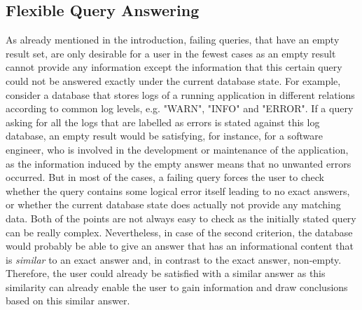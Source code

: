 

\subsection{Flexible Query Answering}
\label{sec:meth_fqa}

As already mentioned in the introduction, failing queries, that have an empty result set, are only desirable for a user in the fewest cases as an empty
result cannot provide any information except the information that this certain query could not be answered exactly under the current database state. For
example, consider a database that stores logs of a running application in different relations according to common log levels, e.g. "WARN", "INFO" and
"ERROR". If a query asking for all the logs that are labelled as errors is stated against this log database, an empty result would be satisfying, for 
instance, for a software engineer, who is involved in the development or maintenance of the application, as the information induced by the empty answer 
means that no unwanted errors occurred. But in most of the cases, a failing query forces the user to check whether the query contains some logical error
itself leading to no exact answers, or whether the current database state does actually not provide any matching data. Both of the points are not always
easy to check as the initially stated query can be really complex. Nevertheless, in case of the second criterion, the database would probably be able to
give an answer that has an informational content that is \emph{similar} to an exact answer and, in contrast to the exact answer, non-empty. Therefore, the
user could already be satisfied with a similar answer as this similarity can already enable the user to gain information and draw conclusions based on this
similar answer.

